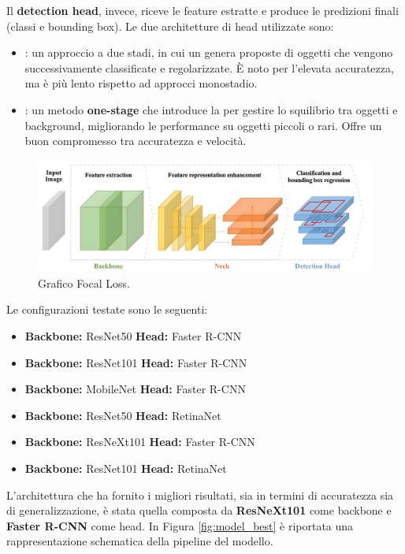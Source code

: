 \documentclass[minted, draw]{../tex/hebdomon}
\begin{document}
Il \textbf{detection head}, invece, riceve le feature estratte e produce le predizioni finali (classi e bounding box). Le due architetture di head utilizzate sono:

\begin{itemize}
	\item {}: un approccio a due stadi, in cui un  genera proposte di oggetti che vengono successivamente classificate e regolarizzate. È noto per l’elevata accuratezza, ma è più lento rispetto ad approcci monostadio.
	\item {}: un metodo \textbf{one-stage} che introduce la  per gestire lo squilibrio tra oggetti e background, migliorando le performance su oggetti piccoli o rari. Offre un buon compromesso tra accuratezza e velocità.
\end{itemize}

%
\begin{figure}[H]
  \centering
  \includegraphics[width=\linewidth]{figures/general_pipeline.png}
  \caption{Grafico Focal Loss.}
  \label{fig:general_pipeline}
\end{figure}
%

Le configurazioni testate sono le seguenti:
\begin{itemize}
    \item \textbf{Backbone:} ResNet50 \quad \textbf{Head:} Faster R-CNN
    \item \textbf{Backbone:} ResNet101 \quad \textbf{Head:} Faster R-CNN
    \item \textbf{Backbone:} MobileNet \quad \textbf{Head:} Faster R-CNN
    \item \textbf{Backbone:} ResNet50 \quad \textbf{Head:} RetinaNet
    \item \textbf{Backbone:} ResNeXt101 \quad \textbf{Head:} Faster R-CNN
    \item \textbf{Backbone:} ResNet101 \quad \textbf{Head:} RetinaNet
\end{itemize}

L’architettura che ha fornito i migliori risultati, sia in termini di accuratezza sia di generalizzazione, è stata quella composta da \textbf{ResNeXt101} come backbone e \textbf{Faster R-CNN} come head. In Figura \ref{fig:model_best} è riportata una rappresentazione schematica della pipeline del modello.
\end{document}
